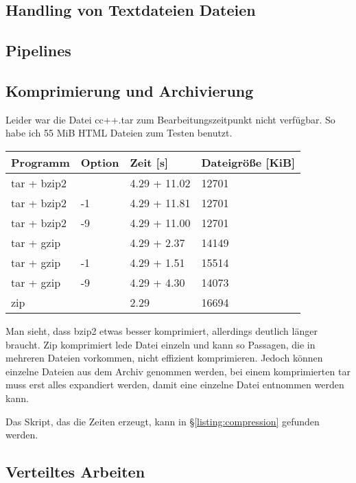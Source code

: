 \documentclass[12pt]{article}
\begin{document}


\subsection{Handling von Textdateien Dateien}



\subsection{Pipelines}



\subsection{Komprimierung und Archivierung}

Leider war die Datei cc++.tar zum Bearbeitungszeitpunkt nicht verfügbar. So habe ich 55 MiB HTML Dateien zum Testen benutzt.

\begin{tabular}{llll}
Programm & Option & Zeit [s] & Dateigröße [KiB] \\
\hline
tar + bzip2 &  & 4.29 + 11.02 & 12701 \\
tar + bzip2 & -1 & 4.29 + 11.81 & 12701 \\
tar + bzip2 & -9 & 4.29 + 11.00 & 12701 \\
tar + gzip &  & 4.29 + 2.37 & 14149 \\
tar + gzip & -1 & 4.29 + 1.51 & 15514 \\
tar + gzip & -9 & 4.29 + 4.30 & 14073 \\
zip &  & 2.29 & 16694\\
\end{tabular}

Man sieht, dass bzip2 etwas besser komprimiert, allerdings deutlich länger braucht. Zip komprimiert lede Datei einzeln und kann so Passagen, die in mehreren Dateien vorkommen, nicht effizient komprimieren. Jedoch können einzelne Dateien aus dem Archiv genommen werden, bei einem komprimierten tar muss erst alles expandiert werden, damit eine einzelne Datei entnommen werden kann.

Das Skript, das die Zeiten erzeugt, kann in §\ref{listing:compression} gefunden werden.


\subsection{Verteiltes Arbeiten}
\end{document}
